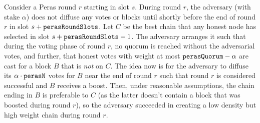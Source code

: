 Consider a Peras round $r$ starting in slot $s$.
During round $r$, the adversary (with stake $\alpha$) does not diffuse any votes or blocks until shortly before the end of round $r$ in slot $s+\mathtt{perasRoundSlots}$.
Let $C$ be the best chain that any honest node has selected in slot $s+\mathtt{perasRoundSlots}-1$.
The adversary arranges it such that during the voting phase of round $r$, no quorum is reached without the adversarial votes, and further, that honest votes with weight at most $\mathtt{perasQuorum} - \alpha$ are cast for a block $B$ that is \emph{not} on $C$.
The idea now is for the adversary to diffuse its $\alpha\cdot\mathtt{perasN}$ votes for $B$ near the end of round $r$ such that round $r$ is considered successful and $B$ receives a boost.
Then, under reasonable assumptions, the chain ending in $B$ is preferable to $C$ (as the latter doesn't contain a block that was boosted during round $r$), so the adversary succeeded in creating a low density but high weight chain during round $r$.

